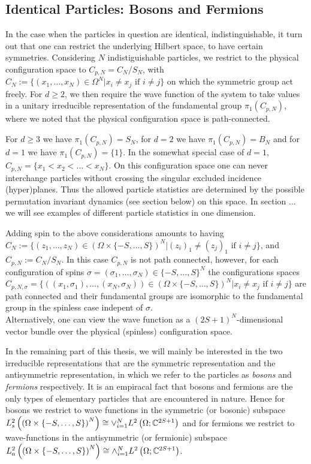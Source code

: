 	\subsection{Identical Particles: Bosons and Fermions}
		In the case when the particles in question are identical, \ie indistinguishable, it turn out that one can restrict the underlying Hilbert space, to have certain symmetries. Considering $ N $ indistiguishable particles, we restrict to the physical configuration space to $ C_{p,N}=C_N/S_N $, with $ C_N:=\{(x_1,\ldots,x_N)\in \Omega^N \vert x_i\neq x_j \text{ if }i\neq j\} $ on which the symmetric group act freely. For $ d\geq 2 $, we then require the wave function of the system to take values in a unitary irreducible representation of the fundamental group $\pi_1(C_{p,N})$, where we noted that the physical configuration space is path-connected.
		\begin{remark}
			For $ d\geq 3 $ we have $\pi_1(C_{p,N})=S_N$, for $ d=2 $ we have $\pi_1(C_{p,N})=B_N$ and for $d=1$ we have $\pi_1(C_{p,N})=\{1\}$. In the somewhat special case of $d=1$, $C_{p,N}=\{x_1<x_2<\ldots<x_N\}$. On this configuration space one can never interchange particles without crossing the singular excluded incidence (hyper)planes. Thus the allowed particle statistics are determined by the possible permutation invariant dynamics (see section below) on this space. In section ... we will see examples of different particle statistics in one dimension. 
		\end{remark}
		\begin{remark}
			Adding spin to the above considerations amounts to having $C_N:=\{(z_1,\ldots,z_N)\in \left(\Omega\times\{-S,\ldots,S\}\right)^N \vert (z_i)_1\neq (z_j)_1 \text{ if }i\neq j\}$, and $C_{p,N}:=C_N/S_N$. In this case $C_{p,N}$ is not path connected, however, for each configuration of spins $ \sigma=(\sigma_1,\ldots,\sigma_N)\in\{-S,\ldots,S\}^N $ the configurations spaces $ C_{p,N,\sigma}=\{((x_1,\sigma_1),\ldots,(x_N,\sigma_N))\in \left(\Omega\times\{-S,\ldots,S\}\right)^N \vert x_i\neq x_j \text{ if }i\neq j\} $ are path connected and their fundamental groups are isomorphic to the fundamental group in the spinless case indepent of $ \sigma $.\\
			Alternatively, one can view the wave function as a $ (2S+1)^N $-dimensional vector bundle over the physical (spinless) configuration space.
		\end{remark}
		In the remaining part of this thesis, we will mainly be interested in the two irreducible representations that are the symmetric representation and the antisymmetric representation, in which we refer to the particles as \emph{bosons} and \emph{fermions} respectively. It is an empiracal fact that bosons and fermions are the only types of elementary particles that are encountered in nature. Hence for bosons we restrict to wave functions in the symmetric (or bosonic) subspace $ L^2_{s}\left(\left(\Omega\times \{-S,\ldots,S\}\right)^N \right)\cong\vee_{i=1}^{N}L^2\left(\Omega; \mathbb{C}^{2S+1}\right)$ and for fermions we restrict to wave-functions in the antisymmetric (or fermionic) subspace $ L^2_{a}\left(\left(\Omega\times \{-S,\ldots,S\}\right)^N \right)\cong\wedge_{i=1}^{N}L^2\left(\Omega; \mathbb{C}^{2S+1}\right)$.\\

